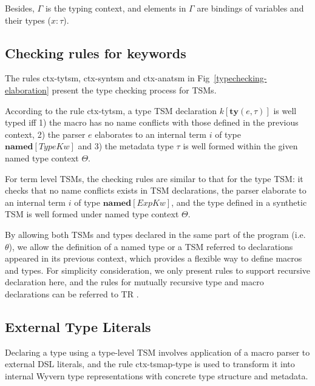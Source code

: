 \documentclass{sig-alternate}
\begin{document}
Besides, $\Gamma$ is the typing context, and elements in $\Gamma$ are bindings of variables and their types ($x:\tau$).

\subsection{Checking rules for keywords}
The rules ctx-tytsm, ctx-syntsm and ctx-anatsm in Fig~\ref{typechecking-elaboration} present the type checking process for TSMs.

According to the rule ctx-tytsm, a type TSM declaration $k[\mathbf{ty}(e,\tau)]$ is well typed iff 1) the macro has no name conflicts with those defined in the previous context, 2) the parser $e$ elaborates to an internal term $i$ of type $\mathbf{named}[TypeKw]$ and 3) the metadata type $\tau$ is well formed within the given named type context $\Theta$.

For term level TSMs, the checking rules are similar to that for the type TSM: it checks that no name conflicts exists in TSM declarations, the parser elaborate to an internal term $i$ of type $\mathbf{named}[ExpKw]$, and the type defined in a synthetic TSM is well formed under named type context $\Theta$.

By allowing both TSMs and types declared in the same part of the program (i.e. $\theta$), we allow the definition of a named type or a TSM referred to declarations appeared in its previous context, which provides a flexible way to define macros and types. For simplicity consideration, we only present rules to support recursive declaration here, and the rules for mutually recursive type and macro declarations can be referred to TR .

\subsection{External Type Literals}
Declaring a type using a type-level TSM involves application of a macro parser to external DSL literals, and the rule ctx-tsmap-type is used to transform it into internal Wyvern type representations with concrete type structure and metadata.
\end{document}

